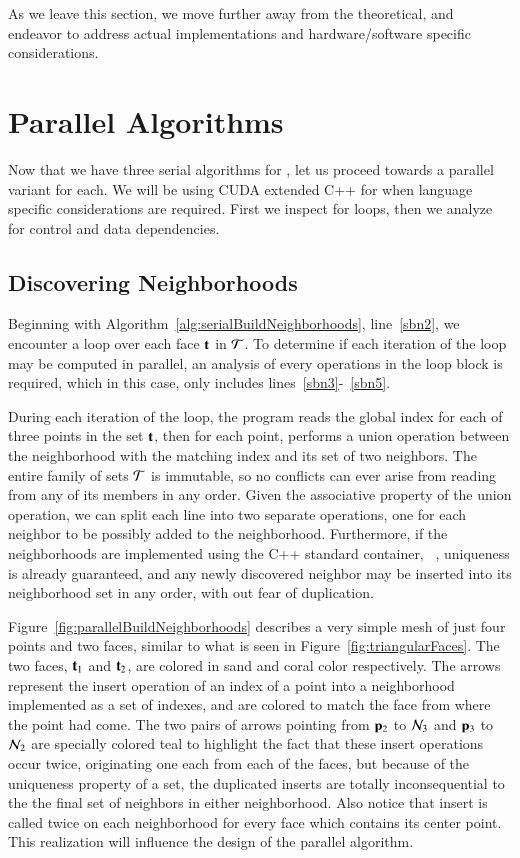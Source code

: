 As we leave this section, we move further away from the theoretical, and endeavor to address actual implementations and hardware/software specific considerations.
\pagebreak

%
%
%
%
\section{Parallel Algorithms}
\label{ch5sPA}
Now that we have three serial algorithms for , let us proceed towards a parallel variant for each. We will be using CUDA extended C++ for when language specific considerations are required. First we inspect for loops, then we analyze for control and data dependencies.

%
%
\subsection{Discovering Neighborhoods}
\label{ch5sPAssDN}
Beginning with Algorithm~\ref{alg:serialBuildNeighborhoods}, line~\ref{sbn2}, we encounter a loop over each face $\mathbf{t}$ in $\mathcal{T}$. To determine if each iteration of the loop may be computed in parallel, an analysis of every operations in the loop block is required, which in this case, only includes lines~\ref{sbn3}-~\ref{sbn5}.

During each iteration of the loop, the program reads the global index for each of three points in the set $\mathbf{t}$, then for each point, performs a union operation between the neighborhood with the matching index and its set of two neighbors. The entire family of sets $\mathcal{T}$ is immutable, so no conflicts can ever arise from reading from any of its members in any order. Given the associative property of the union operation, we can split each line into two separate operations, one for each neighbor to be possibly added to the neighborhood. Furthermore, if the neighborhoods are implemented using the C++ standard container, ~, uniqueness is already guaranteed, and any newly discovered neighbor may be inserted into its neighborhood set in any order, with out fear of duplication.

Figure~\ref{fig:parallelBuildNeighborhoods} describes a very simple mesh of just four points and two faces, similar to what is seen in Figure~\ref{fig:triangularFaces}. The two faces, $\mathbf{t}_1$ and $\mathbf{t}_2$, are colored in sand and coral color respectively. The arrows represent the insert operation of an index of a point into a neighborhood implemented as a set of indexes, and are colored to match the face from where the point had come. The two pairs of arrows pointing from $\mathbf{p}_2$ to $\mathcal{N}_3$ and $\mathbf{p}_3$ to $\mathcal{N}_2$ are specially colored teal to highlight the fact that these insert operations occur twice, originating one each from each of the faces, but because of the uniqueness property of a set, the duplicated inserts are totally inconsequential to the the final set of neighbors in either neighborhood. Also notice that insert is called twice on each neighborhood for every face which contains its center point. This realization will influence the design of the parallel algorithm.


